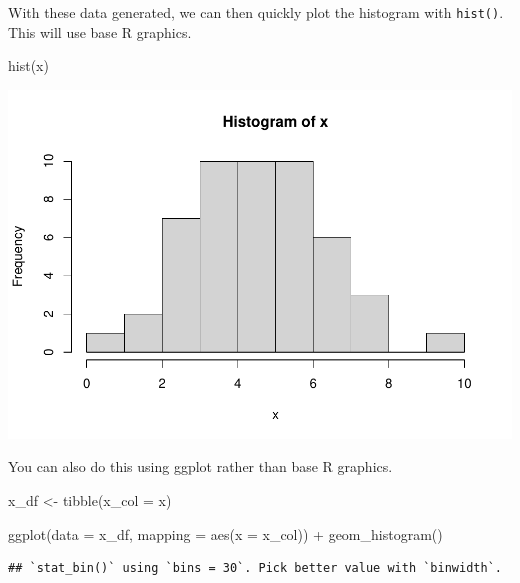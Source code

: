 \documentclass[
]{book}
\newenvironment{Shaded}{\begin{snugshade}}{\end{snugshade}}
\newcommand{\AttributeTok}[1]{\textcolor[rgb]{0.77,0.63,0.00}{#1}}
\newcommand{\FunctionTok}[1]{\textcolor[rgb]{0.00,0.00,0.00}{#1}}
\newcommand{\NormalTok}[1]{#1}
\newcommand{\OtherTok}[1]{\textcolor[rgb]{0.56,0.35,0.01}{#1}}
\newcommand{\SpecialCharTok}[1]{\textcolor[rgb]{0.00,0.00,0.00}{#1}}
\begin{document}
With these data generated, we can then quickly plot the histogram with \texttt{hist()}. This will use base R graphics.

\begin{Shaded}
\begin{Highlighting}[]
\FunctionTok{hist}\NormalTok{(x)}
\end{Highlighting}
\end{Shaded}

\includegraphics{test_course_notes_files/figure-latex/unnamed-chunk-25-1.pdf}

You can also do this using ggplot rather than base R graphics.

\begin{Shaded}
\begin{Highlighting}[]
\NormalTok{x\_df }\OtherTok{\textless{}{-}} \FunctionTok{tibble}\NormalTok{(}\AttributeTok{x\_col =}\NormalTok{ x)}

\FunctionTok{ggplot}\NormalTok{(}\AttributeTok{data =}\NormalTok{ x\_df, }\AttributeTok{mapping =} \FunctionTok{aes}\NormalTok{(}\AttributeTok{x =}\NormalTok{ x\_col)) }\SpecialCharTok{+}
  \FunctionTok{geom\_histogram}\NormalTok{()}
\end{Highlighting}
\end{Shaded}

\begin{verbatim}
## `stat_bin()` using `bins = 30`. Pick better value with `binwidth`.
\end{verbatim}
\end{document}
